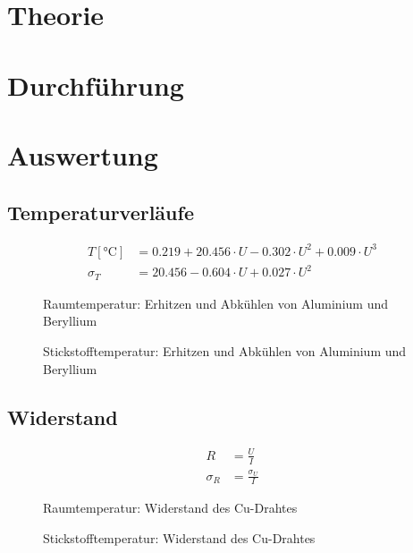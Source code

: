\documentclass[12pt,a4paper,titlepage,headinclude,bibtotoc]{scrartcl}
\begin{document}
\section{Theorie}
\label{sec:theorie}

\section{Durchführung}
\label{sec:durchfuehrung}

\section{Auswertung}
\label{sec:auswertung}
\subsection{Temperaturverläufe}
\begin{align}
	T[\si{\celsius}]&=0.219+20.456 \cdot U - 0.302\cdot U^2+0.009\cdot U^3 \\
	\sigma_T&=20.456 - 0.604\cdot U+0.027\cdot U^2
\end{align}
\begin{figure}[!htb]
	\centering
	
	\caption{Raumtemperatur: Erhitzen und Abkühlen von Aluminium und Beryllium}
	\label{fig:Raumtemp}
\end{figure}

\begin{figure}[!htb]
	\centering
	
	\caption{Stickstofftemperatur: Erhitzen und Abkühlen von Aluminium und Beryllium}
	\label{fig:Stickstofftemp}
\end{figure}

\subsection{Widerstand}
\begin{align}
	R&=\frac{U}{I}\\
	\sigma_R&=\frac{\sigma_U}{I}
\end{align}
\begin{figure}[!htb]
	\centering
	
	\caption{Raumtemperatur: Widerstand des Cu-Drahtes}
	\label{fig:Widerstand_Raum}
\end{figure}

\begin{figure}[!htb]
	\centering
	
	\caption{Stickstofftemperatur: Widerstand des Cu-Drahtes}
	\label{fig:Widerstand_Stick}
\end{figure}
\end{document}

